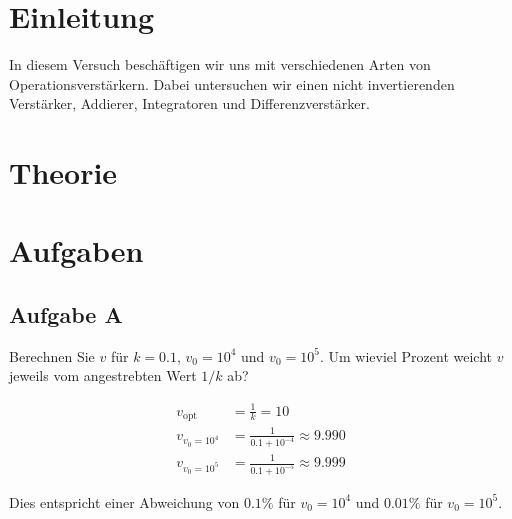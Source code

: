 \FloatBarrier
\section{Einleitung}

In diesem Versuch beschäftigen wir uns mit verschiedenen Arten von
Operationsverstärkern. Dabei untersuchen wir einen nicht invertierenden
Verstärker, Addierer, Integratoren und Differenzverstärker.


\FloatBarrier
\section{Theorie}



\FloatBarrier
\section{Aufgaben}

\FloatBarrier
\subsection{Aufgabe A}

\begin{problem}
    Berechnen Sie $v$ für $k = 0.1$, $v_0 = 10^4$ und $v_0 = 10^5$. Um
    wieviel Prozent weicht $v$ jeweils vom angestrebten Wert $1 / k$ ab?
\end{problem}

\begin{align*}
    v_\text{opt} &= \frac 1k = 10\\
    v_{v_0 = 10^4} &= \frac 1{0.1 + 10^{-4}} \approx 9.990\\
    v_{v_0 = 10^5} &= \frac 1{0.1 + 10^{-5}} \approx 9.999
\end{align*}

Dies entspricht einer Abweichung von $0.1\%$ für $v_0 = 10^4$ und $0.01\%$ für
$v_0 = 10^5$.

